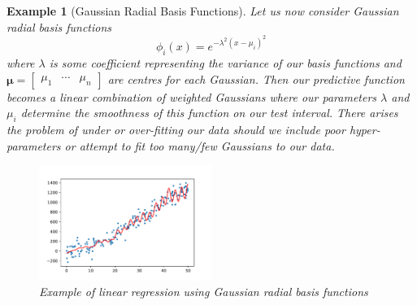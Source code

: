 \documentclass[10pt,a4paper, onecolumn, conference]{IEEEtran}
\theoremstyle{own}
\newtheorem{example}{Example}
\theoremstyle{definition}
\theoremstyle{plain}
\begin{document}
\begin{example}[Gaussian Radial Basis Functions]
Let us now consider Gaussian radial basis functions
\begin{equation}
\phi_i(x) = e^{-\lambda^{2} ( x - \mu_i ) ^{2} }
\end{equation}
where $\lambda$ is some coefficient representing the variance of our basis functions and $\boldsymbol\mu = \left[ \begin{matrix} \mu_1 & \cdots & \mu_n \end{matrix} \right]$ are centres for each Gaussian. Then our predictive function becomes a linear combination of weighted Gaussians where our parameters $\lambda$ and $\mu_i$ determine the smoothness of this function on our test interval. There arises the problem of under or over-fitting our data should we include poor hyper-parameters or attempt to fit too many/few Gaussians to our data.
\begin{figure}[H]
\centering
\includegraphics[width = 0.5\textwidth]{GRBF_example}
\caption{Example of linear regression using Gaussian radial basis functions}
\label{fig2}
\end{figure}
\end{example}












\pagebreak
\appendix
\end{document}
